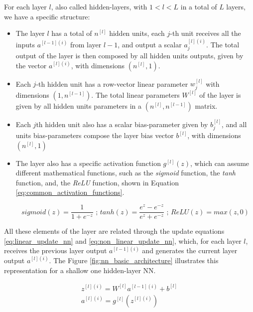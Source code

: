 For each layer $l$, also called hidden-layers, with $1<l<L$ in a total of $L$ layers, we have a specific structure:
\begin{itemize}

\item
	The layer $l$ has a total of $n^{[l]}$ hidden units, each $j$-th unit receives all the inputs $a^{[l-1](i)}$ from layer $l-1$, and output a scalar $a^{[l](i)}_j$. The total output of the layer is then composed by all hidden units outputs, given by the vector $a^{[l](i)}$, with dimensions $(n^{[l]},1)$.
	
\item
	Each $j$-th hidden unit has a row-vector linear parameter $w^{[l]}_j$ with dimensions $(1,n^{[l-1]})$. The total linear parameters $W^{[l]}$ of the layer is given by all hidden units parameters in a $(n^{[l]},n^{[l-1]})$ matrix.
	
\item
	Each $j$th hidden unit also has a scalar bias-parameter given by $b^{[l]}_j$, and all units bias-parameters compose the layer bias vector $b^{[l]}$, with dimensions $(n^{[l]},1)$
	
\item
	The layer also has a specific activation function $g^{[l]}(z)$, which can assume different mathematical functions, such as the \textit{sigmoid} function, the \textit{tanh} function, and, the \textit{ReLU} function, shown in Equation \eqref{eq:common_activation_functions}.

\begin{equation}
sigmoid(z) = \frac{1}{1+e^{-z}} \text{ ; } tanh(z) = \frac{e^z - e^{-z}}{e^z + e^{-z}} \text{ ; } ReLU(z) = max(z,0)
\label{eq:common_activation_functions}
\end{equation}

\end{itemize}

All these elements of the layer are related through the update equations \eqref{eq:linear_update_nn} and \eqref{eq:non_linear_update_nn}, which, for each layer $l$, receives the previous layer output $a^{[l-1](i)}$ and generates the current layer output $a^{[l](i)}$. The Figure \ref{fig:nn_basic_architecture} illustrates this representation for a shallow one hidden-layer NN.

\begin{align}
z^{[l](i)} = W^{[l]}a^{[l-1](i)} + b^{[l]}
\label{eq:linear_update_nn}
\\
a^{[l](i)} = g^{[l]}(z^{[l](i)})
\label{eq:non_linear_update_nn}
\end{align}

